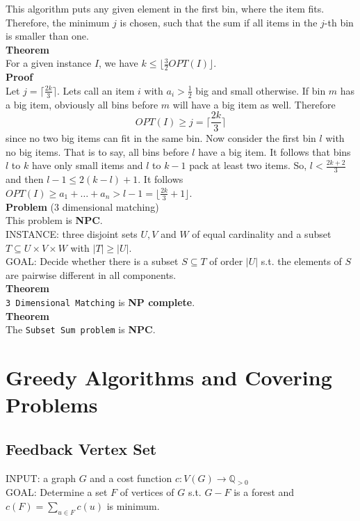 \documentclass[a4paper, 12pt]{article}
\begin{document}
	This algorithm puts any given element in the first bin, where the item fits. Therefore, the minimum $j$ is chosen, such that the sum if all items in the $j$-th bin is smaller than one.\\
	\textbf{Theorem}\\
	For a given instance $I$, we have $k \leq \lfloor \frac{3}{2} OPT(I) \rfloor$.\\
	\textbf{Proof}\\
	Let $j = \lceil \frac{2k}{3} \rceil$. Lets call an item $i$ with $a_i > \frac{1}{2}$ big and small otherwise. If bin $m$ has a big item, obviously all bins before $m$ will have a big item as well. Therefore \[OPT(I) \geq j = \lceil \frac{2k}{3} \rceil\] since no two big items can fit in the same bin. Now consider the first bin $l$ with no big items. That is to say, all bins before $l$ have a big item. It follows that bins $l$ to $k$ have only small items and $l$ to $k-1$ pack at least two items. So, $l < \frac{2k+2}{3}$ and then $l-1 \leq 2(k-l)+1$. It follows $OPT(I) \geq a_1 + \dots + a_n > l-1 = \lfloor \frac{2k}{3} + 1\rfloor$.\\
	
	\noindent\textbf{Problem} (3 dimensional matching)\\
	This problem is \textbf{NPC}.\\
	INSTANCE: three disjoint sets $U, V$ and $W$ of equal cardinality and a subset $T \subseteq U\times V \times W$ with $\left|T\right| \geq \left|U\right|$.\\
	GOAL: Decide whether there is a subset $S\subseteq T$ of order $\left|U\right|$ s.t. the elements of $S$ are pairwise different in all components.\\
	\textbf{Theorem}\\
	\texttt{3 Dimensional Matching} is \textbf{NP complete}.\\
	\textbf{Theorem}\\
	The \texttt{Subset Sum problem} is \textbf{NPC}.

	\section{Greedy Algorithms and Covering Problems}
	\subsection{Feedback Vertex Set}
	INPUT: a graph $G$ and a cost function $c: V(G) \to \mathbb{Q}_{>0}$\\
	GOAL: Determine a set $F$ of vertices of $G$ s.t. $G-F$ is a forest and $c(F) = \sum_{u \in F} c(u)$ is minimum.\\
	
\end{document}
